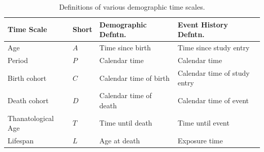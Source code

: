 \documentclass[
  12pt
]{scrartcl}
\begin{document}
\begin{table}[!htb]
  \small
  \begin{tabularx}{\textwidth}{p{}p{}XX}
  \toprule
  \textbf{Time Scale} & \textbf{Short} & \textbf{Demographic Defntn.} & \textbf{Event History Defntn.} \\
  \midrule
  Age & $A$ & Time since birth & Time since study entry \\
  Period & $P$ & Calendar time & Calendar time \\
  Birth cohort & $C$ & Calendar time of birth & Calendar time of study entry \\
  Death cohort & $D$ & Calendar time of death & Calendar time of event \\
  Thanatological Age & $T$ & Time until death & Time until event \\
  Lifespan & $L$ & Age at death & Exposure time \\
  \bottomrule
  \end{tabularx}
  \caption{Definitions of various demographic time scales.}
  \label{tab:def}
\end{table}

\clearpage
\end{document}
